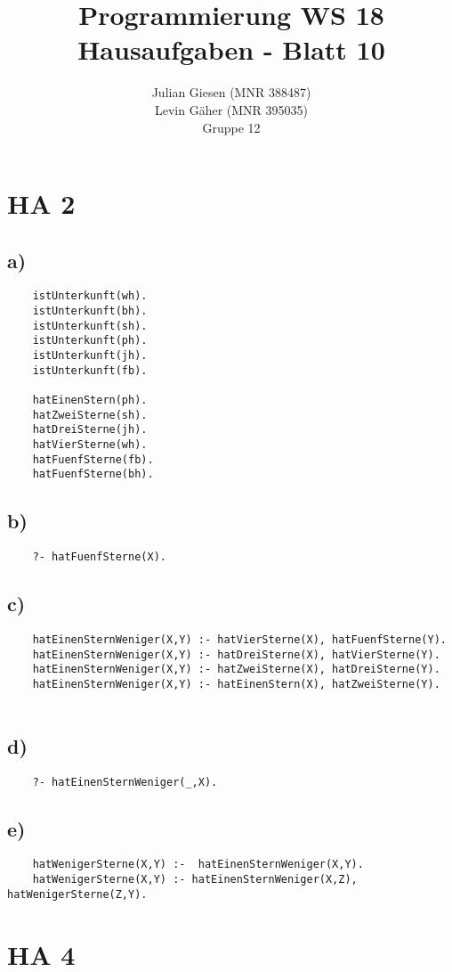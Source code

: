 \documentclass[a4paper]{article}
\title{ Programmierung WS 18 \\ Hausaufgaben - Blatt 10 }
\author{ Julian Giesen (MNR 388487) \\
Levin Gäher (MNR 395035) \\
Gruppe 12 }
\date{  }
\begin{document}
\maketitle

\section*{ HA 2 }
\subsection*{a)}
\begin{lstlisting}
	istUnterkunft(wh).
	istUnterkunft(bh).
	istUnterkunft(sh).
	istUnterkunft(ph).
	istUnterkunft(jh).
	istUnterkunft(fb).
	
	hatEinenStern(ph).
	hatZweiSterne(sh).
	hatDreiSterne(jh).
	hatVierSterne(wh).
	hatFuenfSterne(fb).
	hatFuenfSterne(bh).
\end{lstlisting}

\subsection*{b)}
\begin{lstlisting}
	?- hatFuenfSterne(X).
\end{lstlisting}

\subsection*{c)}
\begin{lstlisting}
	hatEinenSternWeniger(X,Y) :- hatVierSterne(X), hatFuenfSterne(Y).
	hatEinenSternWeniger(X,Y) :- hatDreiSterne(X), hatVierSterne(Y).
	hatEinenSternWeniger(X,Y) :- hatZweiSterne(X), hatDreiSterne(Y).
	hatEinenSternWeniger(X,Y) :- hatEinenStern(X), hatZweiSterne(Y).
	
\end{lstlisting}
\subsection*{d)}
\begin{lstlisting}
	?- hatEinenSternWeniger(_,X).
\end{lstlisting}
\subsection*{e)}
\begin{lstlisting}
	hatWenigerSterne(X,Y) :-  hatEinenSternWeniger(X,Y).
	hatWenigerSterne(X,Y) :- hatEinenSternWeniger(X,Z), hatWenigerSterne(Z,Y).
\end{lstlisting}
\section*{ HA 4 }
\end{document}
